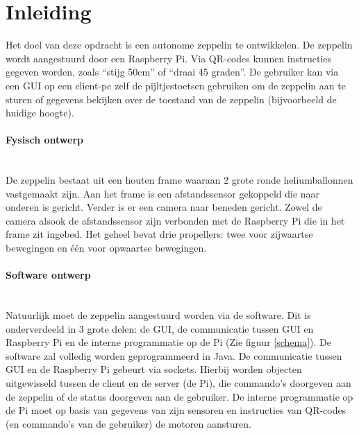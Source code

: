 \documentclass[tt]{penoverslag}
\begin{document}
\maketitlepage


\begin{abstract}

\end{abstract}


\tableofcontents\newpage


\section{Inleiding}
Het doel van deze opdracht is een autonome zeppelin te ontwikkelen. De zeppelin wordt aangestuurd door een Raspberry Pi. Via QR-codes kunnen instructies gegeven worden, zoals ``stijg 50cm'' of ``draai 45   graden''. De gebruiker kan via een GUI op een client-pc zelf de pijltjestoetsen gebruiken om de zeppelin aan te sturen of gegevens bekijken over de toestand van de zeppelin (bijvoorbeeld de huidige hoogte).

\paragraph{Fysisch ontwerp}
~\\ 
De zeppelin bestaat uit een houten frame waaraan 2 grote ronde heliumballonnen vastgemaakt zijn. Aan het frame is een afstandssensor gekoppeld die naar onderen is gericht. Verder is er een camera naar beneden gericht. Zowel de camera alsook de afstandssensor zijn verbonden met de Raspberry Pi die in het frame zit ingebed. Het geheel bevat drie propellers: twee voor zijwaartse bewegingen en \'{e}\'{e}n voor opwaartse bewegingen.


\paragraph{Software ontwerp}
~\\
Natuurlijk moet de zeppelin aangestuurd worden via de software. Dit is onderverdeeld in 3 grote delen: de GUI, de communicatie tussen GUI en Raspberry Pi en de interne programmatie op de Pi (Zie figuur \ref{schema}). De software zal volledig worden geprogrammeerd in Java. 
De communicatie tussen GUI en de Raspberry Pi gebeurt via sockets. Hierbij worden objecten uitgewisseld tussen de client en de server (de Pi), die commando's doorgeven aan de zeppelin of de status doorgeven aan de gebruiker. De interne programmatie op de Pi moet op basis van gegevens van zijn sensoren en instructies van QR-codes (en commando's van de gebruiker) de motoren aansturen. 
\end{document}
